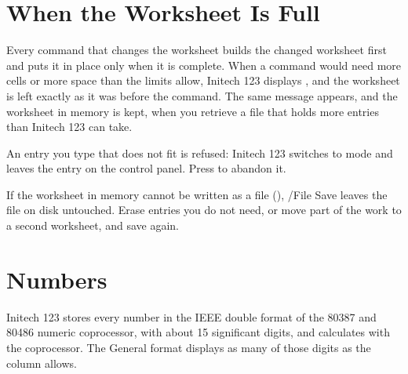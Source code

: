 \section{When the Worksheet Is Full}
Every command that changes the worksheet builds the changed worksheet
first and puts it in place only when it is complete.  When a command would
need more cells or more space than the limits allow, Initech 123 displays
, and the worksheet is left exactly as it
was before the command.  The same message appears, and the worksheet in
memory is kept, when you retrieve a file that holds more entries than
Initech 123 can take.

An entry you type that does not fit is refused: Initech 123 switches to
 mode and leaves the entry on the control panel.  Press
 to abandon it.

If the worksheet in memory cannot be written as a file
(), /File Save leaves the file on disk
untouched.  Erase entries you do not need, or move part of the work to a
second worksheet, and save again.

\section{Numbers}
Initech 123 stores every number in the IEEE double format of the 80387 and
80486 numeric coprocessor, with about 15 significant digits, and calculates
with the coprocessor.  The General format displays as many of those digits
as the column allows.
